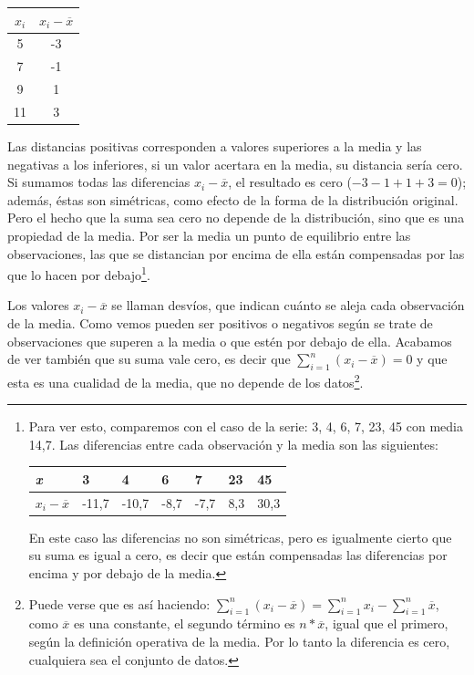 \documentclass[]{book}
\let\rmarkdownfootnote\footnote%
\def\footnote{\protect\rmarkdownfootnote}
\begin{document}
\begin{longtable}[]{@{}cc@{}}
\toprule
\(x_{i}\) & \(x_{i} - \overline{x}\)\tabularnewline
\midrule
\endhead
5 & -3\tabularnewline
7 & -1\tabularnewline
9 & 1\tabularnewline
11 & 3\tabularnewline
\bottomrule
\end{longtable}

Las distancias positivas corresponden a valores superiores a la media y
las negativas a los inferiores, si un valor acertara en la media, su
distancia sería cero. Si sumamos todas las diferencias
\(x_{i} - \overline{x}\), el resultado es cero (\(-3-1+1+3=0\)); además, éstas
son simétricas, como efecto de la forma de la distribución original.
Pero el hecho que la suma sea cero no depende de la distribución, sino que es una propiedad de la media. Por ser la media un punto de equilibrio entre las observaciones, las que se distancian por
encima de ella están compensadas por las que lo hacen por debajo\footnote{Para ver esto, comparemos con el caso de la serie: 3, 4, 6, 7, 23, 45 con media 14,7. Las diferencias entre cada observación y la media son las siguientes:

  \begin{longtable}[]{@{}lllllll@{}}
  \toprule
  \emph{x} & 3 & 4 & 6 & 7 & 23 & 45\tabularnewline
  \midrule
  \endhead
  \(x_{i} - \overline{x}\) & -11,7 & -10,7 & -8,7 & -7,7 & 8,3 & 30,3\tabularnewline
  \bottomrule
  \end{longtable}

  En este caso las diferencias no son simétricas, pero es igualmente
  cierto que su suma es igual a cero, es decir que están compensadas
  las diferencias por encima y por debajo de la media.}.

Los valores \(x_{i} - \overline{x}\) se llaman desvíos, que indican cuánto
se aleja cada observación de la media. Como vemos pueden ser positivos o
negativos según se trate de observaciones que superen a la media o que
estén por debajo de ella. Acabamos de ver también que su suma vale cero,
es decir que \(\sum_{i = 1}^{n}{\left( x_{i} - \overline{x} \right) = 0}\)
y que esta es una cualidad de la media, que no depende de los datos\footnote{Puede verse que es así haciendo: \(\sum_{i = 1}^{n}{\left( x_{i} - \overline{x} \right) = \sum_{i = 1}^{n}x_{i} - \sum_{i = 1}^{n}\overline{x}}\), como \(\overline{x}\) es una constante, el segundo término es \(n*\overline{x}\), igual que el primero, según la definición operativa de la media. Por lo tanto la diferencia es cero, cualquiera sea el conjunto de datos.}.
\end{document}
